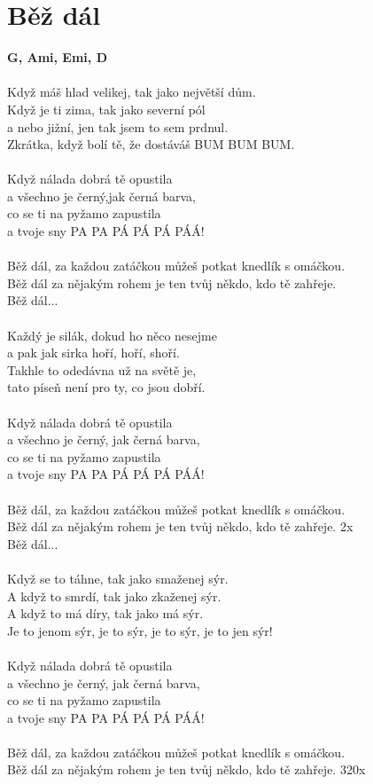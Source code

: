 \section{Běž dál}
\footnotesize\textbf{G, Ami, Emi, D\7}\\
\normalsize
\\
Když máš hlad velikej, tak jako největší dům.\\
Když je ti zima, tak jako severní pól\\
a nebo jižní, jen tak jsem to sem prdnul.\\
Zkrátka, když bolí tě, že dostáváš BUM BUM BUM.\\
\\
Když nálada dobrá tě opustila\\
a všechno je černý,jak černá barva,\\
co se ti na pyžamo zapustila\\
a tvoje sny PA PA PÁ PÁ PÁ PÁÁ!\\
\\
Běž dál, za každou zatáčkou můžeš potkat knedlík s omáčkou.\\
Běž dál za nějakým rohem je ten tvůj někdo, kdo tě zahřeje.\\
Běž dál...\\
\\
Každý je silák, dokud ho něco nesejme\\
a pak jak sirka hoří, hoří, shoří.\\
Takhle to odedávna už na světě je,\\
tato píseň není pro ty, co jsou dobří.\\
\\
Když nálada dobrá tě opustila\\
a všechno je černý, jak černá barva,\\
co se ti na pyžamo zapustila\\
a tvoje sny PA PA PÁ PÁ PÁ PÁÁ!\\
\\
Běž dál, za každou zatáčkou můžeš potkat knedlík s omáčkou.\\
Běž dál za nějakým rohem je ten tvůj někdo, kdo tě zahřeje. 2x\\
Běž dál...\\
\\
Když se to táhne, tak jako smaženej sýr.\\
A když to smrdí, tak jako zkaženej sýr.\\
A když to má díry, tak jako má sýr.\\
Je to jenom sýr, je to sýr, je to sýr, je to jen sýr!\\
\\
Když nálada dobrá tě opustila\\
a všechno je černý, jak černá barva,\\
co se ti na pyžamo zapustila\\
a tvoje sny PA PA PÁ PÁ PÁ PÁÁ!\\
\\
Běž dál, za každou zatáčkou můžeš potkat knedlík s omáčkou.\\
Běž dál za nějakým rohem je ten tvůj někdo, kdo tě zahřeje. 320x